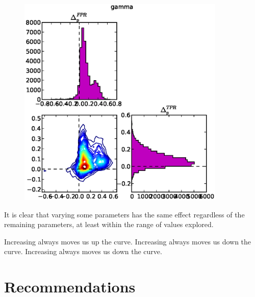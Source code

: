 \begin{figure}[!h]
\begin{center}
\includegraphics[height=4in]{../fig/final/delta_hist/gamma}
\end{center}
\caption{\label{fig:roc_env2}}
\end{figure}


It is clear that varying some parameters has the same effect regardless of the
remaining parameters, at least within the range of values explored. 



Increasing  always moves us up the curve.
Increasing  always moves us down the curve.
Increasing  always moves us down the curve.




\section{Recommendations}
